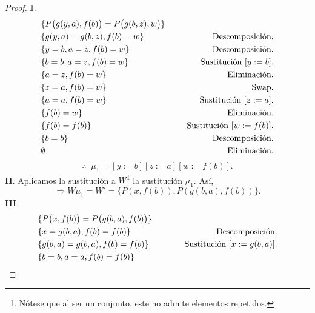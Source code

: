 \documentclass{article}
\begin{document}
\begin{itemize}
\begin{proof}
    \textbf{I}.
    \begin{eqnarray*}
      & \{P\big(g(y,a), f(b)\big) = P\big(g(b,z), w\big)\} &\\
      & \{g(y,a) = g(b,z), f(b) = w\} &
      \hspace*{1cm} \text{Descomposición.}\\
      & \{y = b, a = z, f(b) = w \} &
      \hspace*{1cm} \text{Descomposición.}\\
      & \{b = b, a = z, f(b) = w\} &
      \hspace*{0.8cm} \text{Sustitución } [y := b].\\
      & \{a = z, f(b) = w\} &
      \hspace*{1.4cm} \text{Eliminación.}\\
      & \{z = a, f(b) = w\} &
      \hspace*{1.9cm} \text{Swap.}\\
      & \{a = a, f(b) = w\} &
      \hspace*{0.75cm} \text{Sustitución } [z := a].\\
      & \{f(b) = w\} &
      \hspace*{1.5cm} \text{Eliminación.}\\
      & \{f(b) = f(b)\} &
      \hspace*{0.55cm} \text{Sustitución } [w := f(b)].\\
      & \{b = b\} &
      \hspace*{1.18cm} \text{Descomposición.}\\
      & \emptyset &
      \hspace*{1.5cm} \text{Eliminación.}
    \end{eqnarray*}
    \[ \therefore\;\; \mu_{1} = [y := b][z := a][w := f(b)].\]
    \textbf{II}. Aplicamos la sustitución a $W$\footnote{Nótese que al ser un conjunto, este no
    admite elementos repetidos.} la sustitución $\mu_{1}$. Así,
    \[\Rightarrow W \mu_{1} = W' = \{P(x, f(b)), P(g(b, a), f(b))\}.\]
    \textbf{III}.
    \begin{eqnarray*}
      & \{P\big(x, f(b)\big) = P\big(g(b,a), f(b)\big)\} &\\
      & \{x = g(b,a), f(b) = f(b)\} &
      \hspace*{1.72cm} \text{Descomposición.}\\
      & \{g(b,a) = g(b,a), f(b) = f(b)\} &
      \hspace*{1cm} \text{Sustitución } [x := g(b,a)].\\
      & \{b = b, a = a, f(b) = f(b)\} &

\end{eqnarray*}
\end{proof}
\end{itemize}
\end{document}
